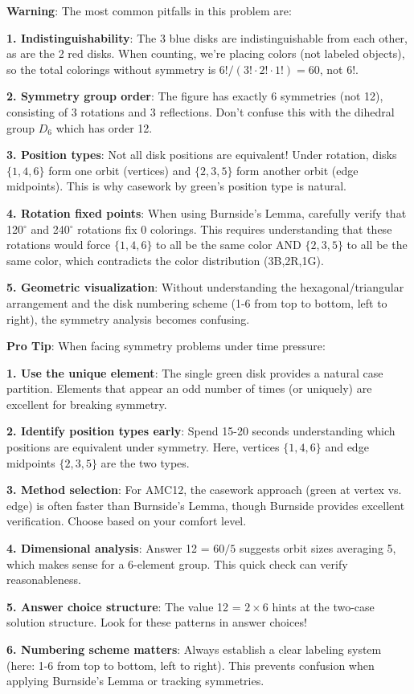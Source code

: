 \documentclass[11pt]{article}
\begin{document}
\begin{warningbox}
\textbf{Warning}: The most common pitfalls in this problem are:

\textbf{1. Indistinguishability}: The 3 blue disks are indistinguishable from each other, as are the 2 red disks. When counting, we're placing colors (not labeled objects), so the total colorings without symmetry is $6!/(3! \cdot 2! \cdot 1!) = 60$, not $6!$.

\textbf{2. Symmetry group order}: The figure has exactly 6 symmetries (not 12), consisting of 3 rotations and 3 reflections. Don't confuse this with the dihedral group $D_6$ which has order 12.

\textbf{3. Position types}: Not all disk positions are equivalent! Under rotation, disks $\{1,4,6\}$ form one orbit (vertices) and $\{2,3,5\}$ form another orbit (edge midpoints). This is why casework by green's position type is natural.

\textbf{4. Rotation fixed points}: When using Burnside's Lemma, carefully verify that 120$^\circ$ and 240$^\circ$ rotations fix 0 colorings. This requires understanding that these rotations would force $\{1,4,6\}$ to all be the same color AND $\{2,3,5\}$ to all be the same color, which contradicts the color distribution (3B,2R,1G).

\textbf{5. Geometric visualization}: Without understanding the hexagonal/triangular arrangement and the disk numbering scheme (1-6 from top to bottom, left to right), the symmetry analysis becomes confusing.
\end{warningbox}

\begin{tipbox}
\textbf{Pro Tip}: When facing symmetry problems under time pressure:

\textbf{1. Use the unique element}: The single green disk provides a natural case partition. Elements that appear an odd number of times (or uniquely) are excellent for breaking symmetry.

\textbf{2. Identify position types early}: Spend 15-20 seconds understanding which positions are equivalent under symmetry. Here, vertices $\{1,4,6\}$ and edge midpoints $\{2,3,5\}$ are the two types.

\textbf{3. Method selection}: For AMC12, the casework approach (green at vertex vs. edge) is often faster than Burnside's Lemma, though Burnside provides excellent verification. Choose based on your comfort level.

\textbf{4. Dimensional analysis}: Answer 12 = $60/5$ suggests orbit sizes averaging 5, which makes sense for a 6-element group. This quick check can verify reasonableness.

\textbf{5. Answer choice structure}: The value 12 = $2 \times 6$ hints at the two-case solution structure. Look for these patterns in answer choices!

\textbf{6. Numbering scheme matters}: Always establish a clear labeling system (here: 1-6 from top to bottom, left to right). This prevents confusion when applying Burnside's Lemma or tracking symmetries.
\end{tipbox}
\end{document}
